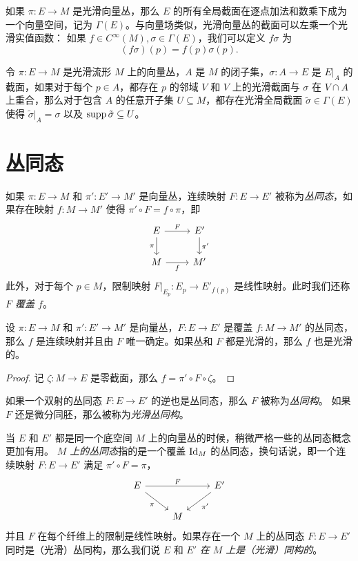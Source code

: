 如果 $\pi:E\to M$ 是光滑向量丛，那么 $E$ 的所有全局截面在逐点加法和数乘下成为一个向量空间，记为
$\Gamma(E)$。与向量场类似，光滑向量丛的截面可以左乘一个光滑实值函数：
如果 $f\in C^\infty(M),\sigma\in\Gamma(E)$，我们可以定义 $f\sigma$ 为
\[
  (f\sigma)(p)=f(p)\sigma(p).
\] 

\begin{lemma}[向量丛的延拓引理]
  令 $\pi:E\to M$ 是光滑流形 $M$ 上的向量丛，$A$ 是 $M$ 的闭子集，$\sigma:A\to E$
  是 $E|_A$ 的截面，如果对于每个 $p\in A$，都存在 $p$ 的邻域 $V$ 和
  $V$ 上的光滑截面与 $\sigma$ 在 $V\cap A$ 上重合，那么对于包含 $A$ 的任意开子集
  $U\subseteq M$，都存在光滑全局截面 $\tilde\sigma\in \Gamma(E)$ 使得
  $\tilde{\sigma}|_A=\sigma$ 以及 $\operatorname{supp}\tilde{\sigma}\subseteq U$。
\end{lemma}


\section{丛同态}

如果 $\pi:E\to M$ 和 $\pi':E'\to M'$ 是向量丛，连续映射 $F:E\to E'$
被称为\emph{丛同态}，如果存在映射 $f:M\to M'$ 使得
$\pi'\circ F=f\circ\pi$，即
\[
  \begin{tikzcd}
    E\arrow[r,"F"]\arrow[d,"\pi"'] & E'\arrow[d,"\pi'"]\\
    M\arrow[r,"f"'] & M' 
  \end{tikzcd}  
\]
此外，对于每个 $p\in M$，限制映射 $F|_{E_p}:E_p\to E'_{f(p)}$
是线性映射。此时我们还称 \emph{$F$ 覆盖 $f$}。

\begin{proposition}
  设 $\pi:E\to M$ 和 $\pi':E'\to M'$ 是向量丛，$F:E\to E'$
  是覆盖 $f:M\to M'$ 的丛同态，那么 $f$ 是连续映射并且由 $F$
  唯一确定。如果丛和 $F$ 都是光滑的，那么 $f$ 也是光滑的。
\end{proposition}
\begin{proof}
  记 $\zeta:M\to E$ 是零截面，那么 $f=\pi'\circ F\circ\zeta$。
\end{proof}

如果一个双射的丛同态 $F:E\to E'$ 的逆也是丛同态，那么 $F$ 被称为\emph{丛同构}。
如果 $F$ 还是微分同胚，那么被称为\emph{光滑丛同构}。

当 $E$ 和 $E'$ 都是同一个底空间 $M$ 上的向量丛的时候，稍微严格一些的丛同态概念更加有用。
\emph{$M$ 上的丛同态}指的是一个覆盖 $\operatorname{Id}_M$ 的丛同态，换句话说，即一个连续映射
$F:E\to E'$ 满足 $\pi'\circ F=\pi$，
\[
  \begin{tikzcd}
    E\arrow[rr,"F"]\arrow[dr,"\pi"'] & & E'\arrow[dl,"\pi'"]\\
    & M & 
  \end{tikzcd}  
\]
并且 $F$ 在每个纤维上的限制是线性映射。如果存在一个 $M$ 上的丛同态
$F:E\to E'$ 同时是（光滑）丛同构，那么我们说 $E$ 和 $E'$ 
\emph{在 $M$ 上是（光滑）同构的}。

